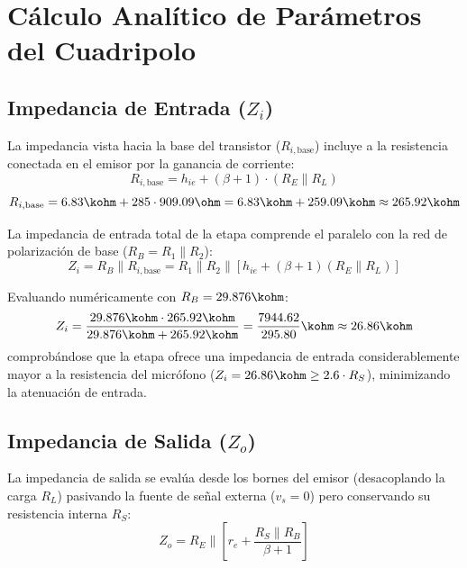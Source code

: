 \section{Cálculo Analítico de Parámetros del Cuadripolo}

\subsection{Impedancia de Entrada (\texorpdfstring{$Z_i$}{Zi})}
La impedancia vista hacia la base del transistor ($R_{i,\mathrm{base}}$) incluye a la resistencia conectada en el emisor por la ganancia de corriente:
\begin{equation}
  R_{i,\mathrm{base}} = h_{ie} + (\beta + 1) \cdot (R_E \parallel R_L)
\end{equation}
\begin{equation}
  R_{i,\mathrm{base}} = 6.83\kohm + 285 \cdot 909.09\ohm = 6.83\kohm + 259.09\kohm \approx 265.92\kohm
\end{equation}

La impedancia de entrada total de la etapa comprende el paralelo con la red de polarización de base ($R_B = R_1 \parallel R_2$):
\begin{equation}
  Z_i = R_B \parallel R_{i,\mathrm{base}} = R_1 \parallel R_2 \parallel \left[ h_{ie} + (\beta + 1)(R_E \parallel R_L) \right]
  \label{eq:Zi_formula}
\end{equation}

Evaluando numéricamente con $R_B = 29.876\kohm$:
\begin{equation}
  Z_i = \frac{29.876\kohm \cdot 265.92\kohm}{29.876\kohm + 265.92\kohm} = \frac{7944.62}{295.80}\kohm \approx 26.86\kohm
  \label{eq:Zi_teorico}
\end{equation}
comprobándose que la etapa ofrece una impedancia de entrada considerablemente mayor a la resistencia del micrófono
($Z_i = 26.86\kohm \ge 2.6 \cdot R_S$), minimizando la atenuación de entrada.

\subsection{Impedancia de Salida (\texorpdfstring{$Z_o$}{Zo})}
La impedancia de salida se evalúa desde los bornes del emisor (desacoplando la carga $R_L$) pasivando la fuente de señal
externa ($v_s = 0$) pero conservando su resistencia interna $R_S$:
\begin{equation}
  Z_o = R_E \parallel \left[ r_e + \frac{R_S \parallel R_B}{\beta + 1} \right]
  \label{eq:Zo_formula}
\end{equation}

